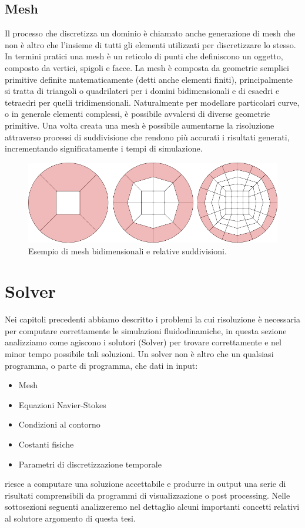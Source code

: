     \subsection{Mesh}\label{mesh}
    Il processo che discretizza un dominio è chiamato anche generazione di mesh che non è altro che l'insieme di tutti gli elementi utilizzati per discretizzare lo stesso.
    In termini pratici una mesh è un reticolo di punti che definiscono un oggetto, composto da vertici, spigoli e facce.
    La mesh è composta da geometrie semplici primitive definite matematicamente (detti anche elementi finiti), principalmente si tratta di triangoli o quadrilateri per i domini bidimensionali e
    di esaedri e tetraedri per quelli tridimensionali. Naturalmente per modellare particolari curve, o in generale elementi complessi, è possibile avvalersi di diverse geometrie primitive.
    Una volta creata una mesh è possibile aumentarne la risoluzione attraverso processi di suddivisione che rendono più accurati i risultati generati, incrementando significatamente i tempi di simulazione.
    \begin{figure}[H]
        \centering
        \includegraphics[width=\linewidth]{figure/subdivision.png}
        \caption{Esempio di mesh bidimensionali e relative suddivisioni.}
    \end{figure}

\section{Solver}\label{solver}
Nei capitoli precedenti abbiamo descritto i problemi la cui risoluzione è necessaria per computare correttamente le simulazioni fluidodinamiche, in questa sezione analizziamo come agiscono i
solutori (Solver) per trovare correttamente e nel minor tempo possibile tali soluzioni.
Un solver non è altro che un qualsiasi programma, o parte di programma, che dati in input:
\begin{itemize}
    \item Mesh
    \item Equazioni Navier-Stokes
    \item Condizioni al contorno
    \item Costanti fisiche
    \item Parametri di discretizzazione temporale
\end{itemize}
riesce a computare una soluzione accettabile e produrre in output una serie di risultati comprensibili da programmi di visualizzazione o post processing.
Nelle sottosezioni seguenti analizzeremo nel dettaglio alcuni importanti concetti relativi al solutore argomento di questa tesi.

